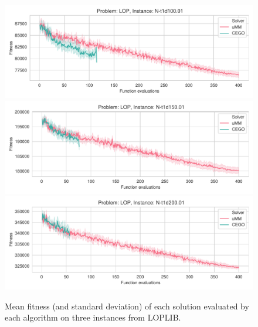 \documentclass[runningheads]{llncs}
\begin{document}
\begin{figure}[tbp]
  \centering%
  \includegraphics[width=\textwidth]{../img/fitness_real_lop_RandA1_N-t1d100_01}\\
  \includegraphics[width=\textwidth]{../img/fitness_real_lop_RandA1_N-t1d150_01}\\
  \includegraphics[width=\textwidth]{../img/fitness_real_lop_RandA1_N-t1d200_01}\\
    \caption{Mean fitness  (and standard deviation)  of each solution evaluated by each algorithm on three instances from LOPLIB.\label{fig:loplib}}
  \end{figure}
\end{document}
